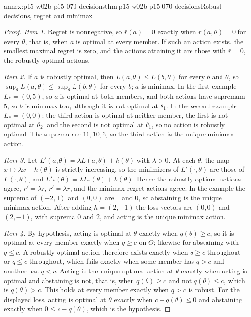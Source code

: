 \begin{annexitem}{annex:p15-w02b-p15-070-decisions}{thm:p15-w02b-p15-070-decisions}{Robust decisions, regret and minimax}
\begin{proof}
\emph{Item 1.} Regret is nonnegative, so \(\bar r(a)=0\) exactly when
\(r(a,\theta)=0\) for every \(\theta\), that is, when \(a\) is optimal at
every member. If such an action exists, the smallest maximal regret is
zero, and the actions attaining it are those with \(\bar r=0\), the
robustly optimal actions.

\emph{Item 2.} If \(a\) is robustly optimal, then
\(L(a,\theta)\leq L(b,\theta)\) for every \(b\) and \(\theta\), so
\(\sup_\theta L(a,\theta)\leq\sup_\theta L(b,\theta)\) for every \(b\);
\(a\) is minimax. In the first example \(L_*=(0,5)\), so \(a\) is
optimal at both members, and both actions have supremum \(5\), so \(b\)
is minimax too, although it is not optimal at \(\theta_1\). In the
second example \(L_*=(0,0)\): the third action is optimal at neither
member, the first is not optimal at \(\theta_2\), and the second is not
optimal at \(\theta_1\), so no action is robustly optimal. The suprema
are \(10,10,6\), so the third action is the unique minimax action.

\emph{Item 3.} Let \(L'(a,\theta)=\lambda L(a,\theta)+h(\theta)\) with
\(\lambda>0\). At each \(\theta\), the map \(x\mapsto\lambda x+h(\theta)\)
is strictly increasing, so the minimizers of \(L'(\cdot,\theta)\) are
those of \(L(\cdot,\theta)\), and
\(L'_*(\theta)=\lambda L_*(\theta)+h(\theta)\). Hence the robustly optimal
actions agree, \(r'=\lambda r\), \(\bar r'=\lambda\bar r\), and the
minimax-regret actions agree. In the example the suprema of
\((-2,1)\) and \((0,0)\) are \(1\) and \(0\), so abstaining is the unique
minimax action. After adding \(h=(2,-1)\) the loss vectors are
\((0,0)\) and \((2,-1)\), with suprema \(0\) and \(2\), and acting is the
unique minimax action.

\emph{Item 4.} By hypothesis, acting is optimal at \(\theta\) exactly
when \(q(\theta)\geq c\), so it is optimal at every member exactly when
\(q\geq c\) on \(\Theta\); likewise for abstaining with \(q\leq c\).
A robustly optimal action therefore exists exactly when \(q\geq c\)
throughout or \(q\leq c\) throughout, which fails exactly when some member
has \(q>c\) and another has \(q<c\). Acting is the unique optimal action
at \(\theta\) exactly when acting is optimal and abstaining is not, that
is, when \(q(\theta)\geq c\) and not \(q(\theta)\leq c\), which is
\(q(\theta)>c\). This holds at every member exactly when \(q>c\) is
robust. For the displayed loss, acting is optimal at \(\theta\) exactly
when \(c-q(\theta)\leq0\) and abstaining exactly when
\(0\leq c-q(\theta)\), which is the hypothesis.
\end{proof}
\end{annexitem}

